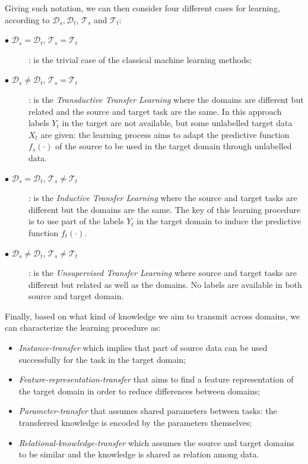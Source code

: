 \documentclass[../main.tex]{subfiles}
\begin{document}
Giving such notation, we can then consider four different cases for learning, according to $\mathcal{D}_s, \mathcal{D}_t$, $\mathcal{T}_s$ and $\mathcal{T}_t$:
\begin{description}
    \item[$\bullet$ $\mathcal{D}_s=\mathcal{D}_t$, $\mathcal{T}_s=\mathcal{T}_t$] : is the trivial case of the classical machine learning methods;
    \item[$\bullet$   $\mathcal{D}_s\not=\mathcal{D}_t$, $\mathcal{T}_s=\mathcal{T}_t$] : is the \textit{Transductive Transfer Learning} where the domains are different but related and the source and target task are the same.
    In this approach labels $Y_{t}$ in the target are not available, but some unlabelled target data $X_{t}$ are given: the learning process aims to adapt the predictive function $f_{s}(\cdot)$ of the source to be used in the target domain through unlabelled data.
    \item[$\bullet$  $\mathcal{D}_s=\mathcal{D}_t$, $\mathcal{T}_s\not=\mathcal{T}_t$] : is the \textit{Inductive Transfer Learning} where  the source and target tasks are different but the domains are the same. 
    The key of this learning procedure is to use part of the labels  $Y_{t}$ in the target domain to induce the predictive function $f_{t}(\cdot)$.  
    \item[$\bullet$  $\mathcal{D}_s\not=\mathcal{D}_t$, $\mathcal{T}_s\not=\mathcal{T}_t$] : is the \textit{Unsupervised Transfer Learning} where source and target tasks are different but related as well as the domains. No labels are available in both source and target domain.
\end{description}

Finally, based on what kind of knowledge we aim to transmit across domains, we can characterize the learning procedure as:

\begin{itemize}
    \item \textit{Instance-transfer} which implies that part of source data can be used successfully for the task in the target domain;
    \item \textit{Feature-representation-transfer} that aims to find a feature representation of the target domain in order to reduce differences between domains;
     \item \textit{Parameter-transfer} that assumes shared parameters between tasks: the transferred knowledge is encoded by the parameters themselves; 
     \item \textit{Relational-knowledge-transfer} which assumes the source and target domains to be similar and the knowledge is shared as relation among data.
\end{itemize}
 
\end{document}
